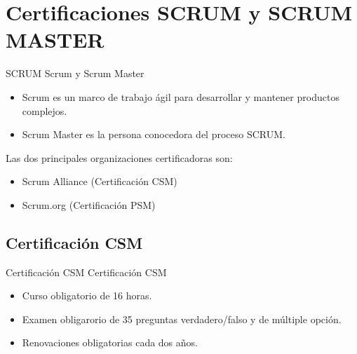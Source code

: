 \section{Certificaciones SCRUM y SCRUM MASTER}
\begin{frame}[allowframebreaks]{SCRUM}
	Scrum y Scrum Master
	\begin{itemize}
		\item Scrum es un marco de trabajo ágil para desarrollar y mantener productos complejos.
		\item Scrum Master es la persona conocedora del proceso SCRUM.
	\end{itemize}

	\framebreak

	Las dos principales organizaciones certificadoras son:
	\begin{itemize}
		\item Scrum Alliance (Certificación CSM)
		\item Scrum.org (Certificación PSM)
	\end{itemize}

\end{frame}

\subsection{Certificación CSM}

\begin{frame}{Certificación CSM}
	Certificación CSM 
	\begin{itemize}
		\item Curso obligatorio de 16 horas.
		\item Examen obligarorio de 35 preguntas verdadero/falso y de múltiple opción.
		\item Renovaciones obligatorias cada dos años.
	\end{itemize}

\end{frame}


